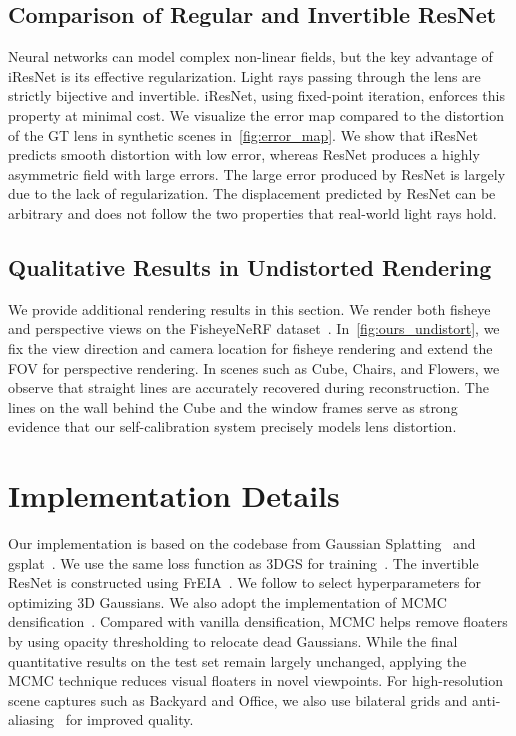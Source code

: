 \subsection{Comparison of Regular and Invertible ResNet}
Neural networks can model complex non-linear fields, but the key advantage of iResNet is its effective regularization. Light rays passing through the lens are strictly bijective and invertible. iResNet, using fixed-point iteration, enforces this property at minimal cost. We visualize the error map compared to the distortion of the GT lens in synthetic scenes in~\cref{fig:error_map}. We show that iResNet predicts smooth distortion with low error, whereas ResNet produces a highly asymmetric field with large errors. The large error produced by ResNet is largely due to the lack of regularization. The displacement predicted by ResNet can be arbitrary and does not follow the two properties that real-world light rays hold.

\subsection{Qualitative Results in Undistorted Rendering}

We provide additional rendering results in this section. We render both fisheye and perspective views on the FisheyeNeRF dataset~\cite{jeong2021self}. In~\cref{fig:ours_undistort}, we fix the view direction and camera location for fisheye rendering and extend the FOV for perspective rendering. In scenes such as Cube, Chairs, and Flowers, we observe that straight lines are accurately recovered during reconstruction. The lines on the wall behind the Cube and the window frames serve as strong evidence that our self-calibration system precisely models lens distortion.

\section{Implementation Details}
Our implementation is based on the codebase from Gaussian Splatting~\cite{kerbl20233d} and gsplat~\cite{ye2024gsplatopensourcelibrarygaussian}. We use the same loss function as 3DGS for training~\cite{kerbl20233d}. 
The invertible ResNet is constructed using FrEIA~\cite{freia}. 
We follow \citet{kerbl20233d} to select hyperparameters for optimizing 3D Gaussians. 
We also adopt the implementation of MCMC densification~\cite{kheradmand20243d}. 
Compared with vanilla densification, MCMC helps remove floaters by using opacity thresholding to relocate dead Gaussians. 
While the final quantitative results on the test set remain largely unchanged, applying the MCMC technique reduces visual floaters in novel viewpoints. 
For high-resolution scene captures such as Backyard and Office, we also use bilateral grids and anti-aliasing~\cite{yu2024mip} for improved quality.

